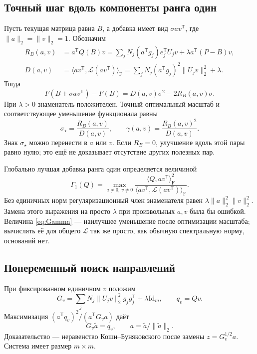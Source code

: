 \documentclass[11pt,a4paper]{article}
\numberwithin{equation}{section}
\theoremstyle{remark}
\newcommand{\Id}{\mathrm{Id}}
\newcommand{\T}{^{\mathsf T}}
\newcommand{\ip}[2]{\langle #1,#2\rangle_{\mathrm F}}
\begin{document}
\subsection{Точный шаг вдоль компоненты ранга один}
Пусть текущая матрица равна $B$, а добавка имеет вид $\sigma av\T$,
где $\|a\|_2=\|v\|_2=1$. Обозначим
\begin{align}
 R_B(a,v)&=a\T Q(B)v
 =\sum_jN_j(a\T g_j)e_j\T U_jv+\lambda a\T(P-B)v,\label{eq:R}\\
 D(a,v)&=\ip{av\T}{\mathcal L(av\T)}
 =\sum_jN_j(a\T g_j)^2\|U_jv\|_2^2+\lambda.\label{eq:D}
\end{align}
Тогда
\begin{equation}\label{eq:linesearch}
 F(B+\sigma av\T)-F(B)=D(a,v)\sigma^2-2R_B(a,v)\sigma.
\end{equation}
При $\lambda>0$ знаменатель положителен. Точный оптимальный масштаб и
соответствующее уменьшение функционала равны
\begin{equation}\label{eq:gain}
 \sigma_\star=\frac{R_B(a,v)}{D(a,v)},
 \qquad \gamma(a,v)=\frac{R_B(a,v)^2}{D(a,v)}.
\end{equation}
Знак $\sigma_\star$ можно перенести в $a$ или $v$.
Если $R_B=0$, улучшение вдоль этой пары равно нулю; это ещё не доказывает
отсутствие других полезных пар.

Глобально лучшая добавка ранга один определяется величиной
\begin{equation}\label{eq:Gamma}
 \Gamma_1(Q)=\max_{a\ne0,\ v\ne0}
 \frac{\ip{Q}{av\T}^2}{\ip{av\T}{\mathcal L(av\T)}}.
\end{equation}
Без единичных норм регуляризационный член знаменателя равен
$\lambda\|a\|_2^2\|v\|_2^2$. Замена этого выражения на просто $\lambda$
при произвольных $a,v$ была бы ошибкой.
Величина \eqref{eq:Gamma} --- наилучшее уменьшение после оптимизации
масштаба; вычислять её для общего $\mathcal L$ так же просто, как обычную
спектральную норму, оснований нет.

\subsection{Попеременный поиск направлений}
При фиксированном единичном $v$ положим
\begin{equation}\label{eq:Gv}
 G_v=\sum_jN_j\|U_jv\|_2^2g_jg_j\T+\lambda\Id_m,
 \qquad q_v=Qv.
\end{equation}
Максимизация $(a\T q_v)^2/(a\T G_va)$ даёт
\begin{equation}\label{eq:astep}
 G_v\widetilde a=q_v,\qquad a=\widetilde a/\|\widetilde a\|_2.
\end{equation}
Доказательство --- неравенство Коши--Буняковского после замены
$z=G_v^{1/2}a$. Система имеет размер $m\times m$.
\end{document}
